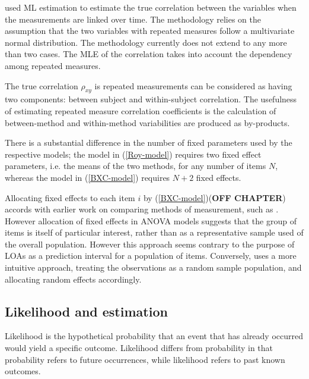 \documentclass[12pt, a4paper]{report}
\theoremstyle{plain}
\theoremstyle{definition}
\theoremstyle{remark}
\begin{document}
	\citet{lam} used ML estimation to estimate the true correlation between the variables when the measurements are linked over time. The methodology relies on the assumption that the two variables with repeated measures follow a multivariate normal distribution. The methodology currently does not extend to any more than two cases. The MLE of the correlation takes into account the dependency among repeated measures.
	
	The true correlation $\rho_{xy}$ is repeated measurements can be considered as having two components: between subject and within-subject correlation. The usefulness of estimating repeated measure correlation coefficients is the calculation of between-method and within-method variabilities are produced as by-products.
	
	
	
	
	
	There is a substantial difference in the number of fixed parameters used by the respective models; the model in (\ref{Roy-model}) requires two fixed effect parameters, i.e. the means of the two methods, for any number of items $N$, whereas the model in (\ref{BXC-model}) requires $N+2$ fixed effects.
	
	Allocating fixed effects to each item $i$ by (\ref{BXC-model})(\textbf{OFF CHAPTER}) accords with earlier work on comparing methods of measurement, such as \citet{Grubbs48}. However allocation of fixed effects in ANOVA models suggests that the group of items is itself of particular interest, rather than as a representative sample used of the overall population. However this approach seems contrary to the purpose of LOAs as a prediction interval for a population of items. Conversely, \citet{ARoy2009}
	uses a more intuitive approach, treating the observations as a random sample population, and allocating random effects accordingly.
	
	
	
	
	
	
	
	
	
	
	
	
	
	
	
	
	
	
	
	
	
	
	

	\subsection{Likelihood and estimation}
	Likelihood is the hypothetical probability that an event that has
	already occurred would yield a specific outcome. Likelihood
	differs from probability in that probability refers to future
	occurrences, while likelihood refers to past known outcomes.
	
\end{document}
